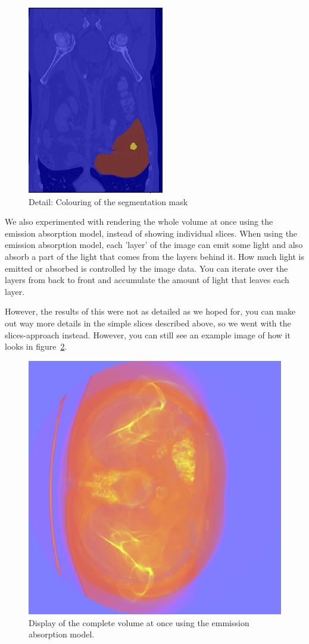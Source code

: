 \documentclass{article}
\begin{document}
			\begin{figure}[tbp]
				\centering
				\includegraphics[width=.6\textwidth]{images/image+labels}
				\caption{Detail: Colouring of the segmentation mask}
				\label{fig:figure4}
			\end{figure}

			We also experimented with rendering the whole volume at once using the emission absorption model, instead of showing individual slices. When using the emission absorption model, each 'layer' of the image can emit some light and also absorb a part of the light that comes from the layers behind it. How much light is emitted or absorbed is controlled by the image data. You can iterate over the layers from back to front and accumulate the amount of light that leaves each layer. 

			However, the results of this were not as detailed as we hoped for, you can make out way more details in the simple slices described above, so we went with the slices-approach instead. However, you can still see an example image of how it looks in figure~\ref{fig:figure5}.

			\begin{figure}[tbp]
				\centering
				\includegraphics[width=.6\textwidth]{images/emit-absorb}
				\caption{Display of the complete volume at once using the emmission absorption model.}
				\label{fig:figure5}
			\end{figure}
\end{document}
